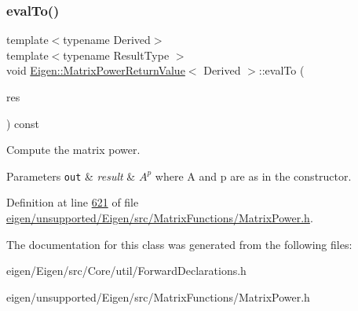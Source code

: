 \mbox{\label{class_eigen_1_1_matrix_power_return_value_acdef58da9a4bcd2ec70260e73ce31973}} 
\subsubsection{\texorpdfstring{eval\+To()}{evalTo()}\hspace{0.1cm}{\footnotesize\ttfamily [2/2]}}
{\footnotesize\ttfamily template$<$typename Derived$>$ \\
template$<$typename Result\+Type $>$ \\
void \hyperlink{class_eigen_1_1_matrix_power_return_value}{Eigen\+::\+Matrix\+Power\+Return\+Value}$<$ Derived $>$\+::eval\+To (\begin{DoxyParamCaption}\item[{Result\+Type \&}]{res }\end{DoxyParamCaption}) const\hspace{0.3cm}{\ttfamily [inline]}}



Compute the matrix power. 


\begin{DoxyParams}[1]{Parameters}
\mbox{\tt out}  & {\em result} & $ A^p $ where {\ttfamily A} and {\ttfamily p} are as in the constructor. \\
\hline
\end{DoxyParams}


Definition at line \hyperlink{eigen_2unsupported_2_eigen_2src_2_matrix_functions_2_matrix_power_8h_source_l00621}{621} of file \hyperlink{eigen_2unsupported_2_eigen_2src_2_matrix_functions_2_matrix_power_8h_source}{eigen/unsupported/\+Eigen/src/\+Matrix\+Functions/\+Matrix\+Power.\+h}.



The documentation for this class was generated from the following files\+:\begin{DoxyCompactItemize}
\item 
eigen/\+Eigen/src/\+Core/util/\+Forward\+Declarations.\+h\item 
eigen/unsupported/\+Eigen/src/\+Matrix\+Functions/\+Matrix\+Power.\+h\end{DoxyCompactItemize}
